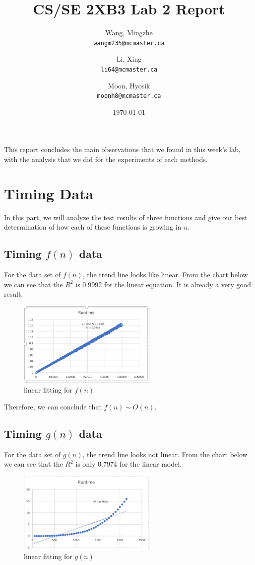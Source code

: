 \documentclass[12pt]{article}
\title{CS/SE 2XB3 Lab 2 Report}
\author{
  Wang, Mingzhe\\
  \texttt{wangm235@mcmaster.ca}
  \and
  Li, Xing\\
  \texttt{li64@mcmaster.ca}
  \and
  Moon, Hyosik\\
  \texttt{moonh8@mcmaster.ca}
  }
\date{\today}
\begin{document}
\maketitle

This report concludes the main observations that we found in this week's lab, with the analysis that we did for the experiments of each methods.

\section{Timing Data}
In this part, we will analyze the test results of three functions and give our best determination of how each of these functions is growing in $n$.
\subsection{Timing \(f(n)\) data}
For the data set of \(f(n)\), the trend line looks like linear. From the chart below we can see that the \(R^2\) is 0.9992 for the linear equation. It is already a very good result.

\begin{figure}[h!]
\centering
\includegraphics[width=0.6\textwidth,height=\textheight,keepaspectratio]{fn_1.png}
\caption{linear fitting for $f(n)$}
\label{Figure: fn_1}
\end{figure}

\newpage Therefore, we can conclude that $f(n) \sim O(n)$.

\subsection{Timing \(g(n)\) data}
For the data set of \(g(n)\), the trend line looks not linear. From the chart below we can see that the $R^2$ is only 0.7974 for the linear model.

\begin{figure}[h!]
\centering
\includegraphics[width=0.6\textwidth,height=\textheight,keepaspectratio]{gn_1.png}
\caption{linear fitting for $g(n)$}
\label{Figure: gn_1}
\end{figure}
\end{document}
